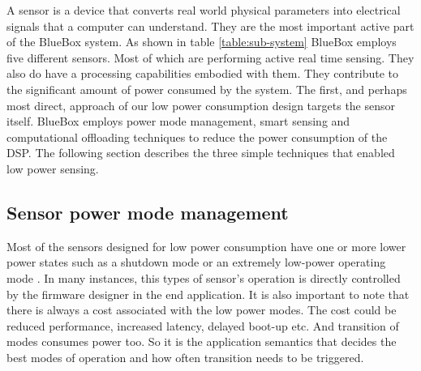  A sensor is a device that converts real world physical parameters into electrical signals that a computer can understand. They are the most important active part of the BlueBox system. As shown in table \ref{table:sub-system} BlueBox employs five different sensors. Most of which are performing active real time sensing. They also do have a processing capabilities embodied with them. They contribute to the significant amount of power consumed by the system. The first, and perhaps most direct, approach of our low power consumption design targets the sensor itself. BlueBox employs power mode management, smart sensing and computational offloading techniques to reduce the power consumption of the DSP. The following section describes the three simple techniques that enabled low power sensing.
 \subsection{Sensor power mode management}
 Most of the sensors designed for low power consumption have one or more lower power states such as a shutdown mode or an extremely low-power operating mode \cite{lowpwrsensing}. In many instances, this types of sensor's operation is directly controlled by the firmware designer in the end application. It is also important to note that there is always a cost associated with the low power modes. The cost could be reduced performance, increased latency, delayed boot-up etc. And transition of modes consumes power too. So it is the application semantics that decides the best modes of operation and how often transition needs to be triggered. 
 
